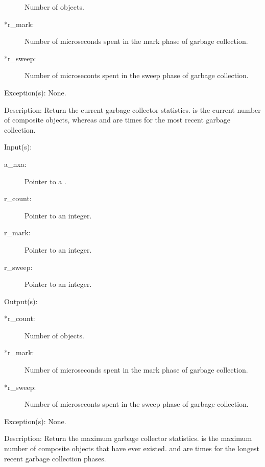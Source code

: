 \begin{capi}
\begin{capilist}
\begin{description}
			Number of objects.
		\item[*r\_mark: ]
			Number of microseconds spent in the mark phase of
			garbage collection.
		\item[*r\_sweep: ]
			Number of microseconts spent in the sweep phase of
			garbage collection.
		\end{description}
	\item[Exception(s): ] None.
	\item[Description: ]
		Return the current garbage collector statistics.
		 is the current number of composite objects,
		whereas  and  are times for the
		most recent garbage collection.
	\end{capilist}
\label{nxa_maximum_get}
	\begin{capilist}
	\item[Input(s): ]
		\begin{description}\item[]
		\item[a\_nxa: ]
			Pointer to a .
		\item[r\_count: ]
			Pointer to an integer.
		\item[r\_mark: ]
			Pointer to an integer.
		\item[r\_sweep: ]
			Pointer to an integer.
		\end{description}
	\item[Output(s): ]
		\begin{description}\item[]
		\item[*r\_count: ]
			Number of objects.
		\item[*r\_mark: ]
			Number of microseconds spent in the mark phase of
			garbage collection.
		\item[*r\_sweep: ]
			Number of microseconts spent in the sweep phase of
			garbage collection.
		\end{description}
	\item[Exception(s): ] None.
	\item[Description: ]
		Return the maximum garbage collector statistics.
		 is the maximum number of composite objects that
		have ever existed.  and  are
		times for the longest recent garbage collection phases.
	\end{capilist}
\label{nxa_sum_get}

\end{capi}
